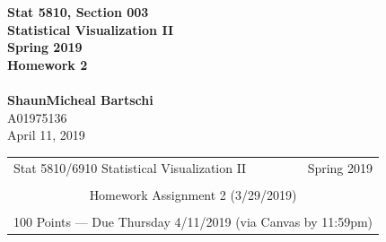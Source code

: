 \documentclass[12pt,letterpaper,final]{article}
\begin{document}


\begin{titlepage}
\vspace*{4.5cm}
\begin{center}
{\LARGE \bf Stat 5810, Section 003} \\[0.5cm]
{\LARGE \bf Statistical Visualization II} \\[0.5cm]
{\LARGE \bf Spring 2019} \\[0.5cm]
{\LARGE \bf Homework 2} \\[0.5cm]
~ \\[2cm]
{\bf ShaunMicheal Bartschi} \\[0.3cm]
{A01975136} \\[0.3cm]
{April 11, 2019} \\[0.3cm]
\end{center}

\thispagestyle{empty}
\vfill
\end{titlepage}


\begin{table}\centering
\begin{tabular*}{6.15in}{@{\extracolsep{\fill}}|llr|} \hline
Stat 5810/6910 Statistical Visualization II  & \hspace*{0.5 in} & Spring 2019 \\
 & & \\
\multicolumn{3}{|c|}{
Homework Assignment 2 (3/29/2019)} \\
 & & \\
\multicolumn{3}{|c|}{
100 Points --- Due Thursday 4/11/2019 (via Canvas by 11:59pm)} \\
\hline
\end{tabular*}
\end{table}
\end{document}
